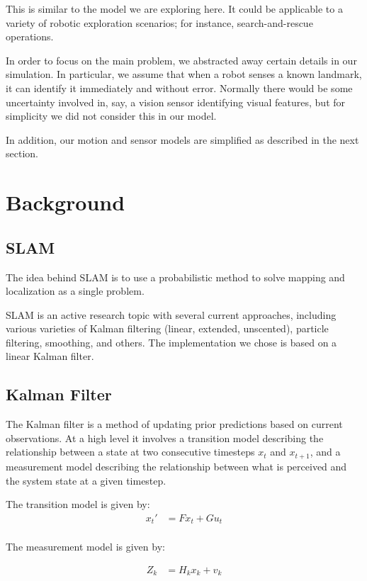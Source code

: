 \documentclass[prodmode,acmtecs]{acmsmall} %
\begin{document}
This is similar to the model we are exploring here.  It could be applicable to a variety of robotic exploration scenarios; for instance, search-and-rescue operations.

In order to focus on the main problem, we abstracted away certain details in our simulation.  In particular, we assume that when a robot senses a known landmark, it can identify it immediately and without error.  Normally there would be some uncertainty involved in, say, a vision sensor identifying visual features, but for simplicity we did not consider this in our model.

In addition, our motion and sensor models are simplified as described in the next section.

\section{Background}

\subsection{SLAM}

The idea behind SLAM is to use a probabilistic method to solve mapping and localization as a single problem. 

SLAM is an active research topic with several current approaches, including various varieties of Kalman filtering (linear, extended, unscented), particle filtering, smoothing, and others.  The implementation we chose is based on a linear Kalman filter.

\subsection{Kalman Filter}

The Kalman filter is a method of updating prior predictions based on current observations.  At a high level it involves a transition model describing the relationship between a state at two consecutive timesteps $x_t$ and $x_{t+1}$, and a measurement model describing the relationship between what is perceived and the system state at a given timestep.

The transition model is given by:
\begin{align*}
    x_t' &= F x_t + G u_t \\
\end{align*}

The measurement model is given by:

\begin{align*}
    Z_k &= H_k x_k + v_k
\end{align*}
\end{document}
